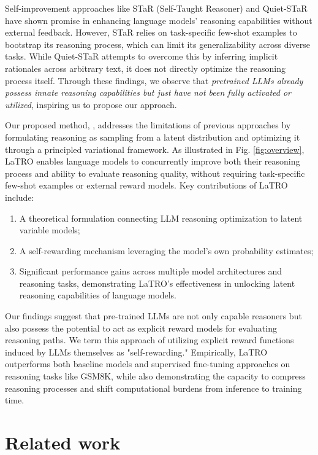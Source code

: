 Self-improvement approaches like STaR (Self-Taught Reasoner) \citep{zelikman2022star} and Quiet-STaR \citep{zelikman2024quiet} have shown promise in enhancing language models' reasoning capabilities without external feedback. 
However, STaR relies on task-specific few-shot examples to bootstrap its reasoning process, which can limit its generalizability across diverse tasks. While Quiet-STaR attempts to overcome this by inferring implicit rationales across arbitrary text, it does not directly optimize the reasoning process itself. Through these findings, we observe that \textit{pretrained LLMs already possess innate reasoning capabilities but just have not been fully activated or utilized}, inspiring us to propose our approach.

Our proposed method, \methodfull, addresses the limitations of previous approaches by formulating reasoning as sampling from a latent distribution and optimizing it through a principled variational framework. As illustrated in Fig. \ref{fig:overview}, LaTRO enables language models to concurrently improve both their reasoning process and ability to evaluate reasoning quality, without requiring task-specific few-shot examples or external reward models.
Key contributions of LaTRO include:
\begin{enumerate}[left=4pt]
\item A theoretical formulation connecting LLM reasoning optimization to latent variable models;
\item A self-rewarding mechanism leveraging the model's own probability estimates;
\item Significant performance gains across multiple model architectures and reasoning tasks, demonstrating LaTRO's effectiveness in unlocking latent reasoning capabilities of language models.
\end{enumerate}
Our findings suggest that pre-trained LLMs are not only capable reasoners but also possess the potential to act as explicit reward models for evaluating reasoning paths. We term this approach of utilizing explicit reward functions induced by LLMs themselves as "self-rewarding." Empirically, LaTRO outperforms both baseline models and supervised fine-tuning approaches on reasoning tasks like GSM8K, while also demonstrating the capacity to compress reasoning processes and shift computational burdens from inference to training time.


\section{Related work}
